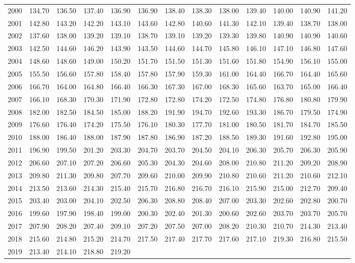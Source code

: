 \begin{longtable}{rrrrrrrrrrrrr}
  2000 & 134.70 & 136.50 & 137.40 & 136.90 & 136.90 & 138.40 & 138.30 & 138.00 & 139.40 & 140.00 & 140.90 & 141.20 \\ 
  2001 & 142.80 & 143.20 & 142.20 & 143.10 & 143.60 & 142.80 & 140.60 & 141.30 & 142.10 & 139.40 & 138.70 & 138.00 \\ 
  2002 & 137.60 & 138.00 & 139.20 & 139.10 & 138.70 & 139.10 & 139.20 & 139.30 & 139.80 & 140.90 & 140.90 & 140.60 \\ 
  2003 & 142.50 & 144.60 & 146.20 & 143.90 & 143.50 & 144.60 & 144.70 & 145.80 & 146.10 & 147.10 & 146.80 & 147.60 \\ 
  2004 & 148.60 & 148.60 & 149.00 & 150.20 & 151.70 & 151.50 & 151.30 & 151.60 & 151.80 & 154.90 & 156.10 & 155.00 \\ 
  2005 & 155.50 & 156.60 & 157.80 & 158.40 & 157.80 & 157.90 & 159.30 & 161.00 & 164.40 & 166.70 & 164.40 & 165.60 \\ 
  2006 & 166.70 & 164.00 & 164.80 & 166.40 & 166.30 & 167.30 & 167.00 & 168.30 & 165.60 & 163.70 & 165.00 & 166.40 \\ 
  2007 & 166.10 & 168.30 & 170.30 & 171.90 & 172.80 & 172.80 & 174.20 & 172.50 & 174.80 & 176.80 & 180.80 & 179.90 \\ 
  2008 & 182.00 & 182.50 & 184.50 & 185.00 & 188.20 & 191.90 & 194.70 & 192.60 & 193.30 & 186.70 & 179.50 & 174.90 \\ 
  2009 & 176.60 & 176.40 & 174.20 & 175.50 & 176.10 & 180.30 & 177.70 & 181.00 & 180.50 & 181.70 & 184.70 & 185.50 \\ 
  2010 & 188.00 & 186.40 & 188.00 & 187.90 & 187.80 & 186.90 & 187.20 & 188.50 & 189.30 & 191.60 & 192.80 & 195.00 \\ 
  2011 & 196.90 & 199.50 & 201.20 & 203.30 & 204.70 & 203.70 & 204.50 & 204.10 & 206.30 & 205.70 & 206.30 & 205.90 \\ 
  2012 & 206.60 & 207.10 & 207.20 & 206.60 & 205.30 & 204.30 & 204.60 & 208.00 & 210.80 & 211.20 & 209.20 & 208.90 \\ 
  2013 & 209.80 & 211.30 & 209.80 & 207.70 & 209.60 & 210.00 & 209.90 & 210.80 & 210.60 & 211.20 & 210.60 & 212.10 \\ 
  2014 & 213.50 & 213.60 & 214.30 & 215.40 & 215.70 & 216.80 & 216.70 & 216.10 & 215.90 & 215.00 & 212.70 & 209.40 \\ 
  2015 & 203.40 & 203.00 & 204.10 & 202.50 & 206.30 & 208.80 & 208.40 & 207.00 & 203.30 & 202.60 & 202.80 & 200.70 \\ 
  2016 & 199.60 & 197.90 & 198.40 & 199.00 & 200.30 & 202.40 & 201.30 & 200.60 & 202.60 & 203.70 & 203.70 & 205.70 \\ 
  2017 & 207.90 & 208.20 & 207.40 & 209.10 & 207.20 & 207.50 & 207.00 & 208.20 & 210.30 & 210.70 & 214.30 & 213.40 \\ 
  2018 & 215.60 & 214.80 & 215.20 & 214.70 & 217.50 & 217.40 & 217.70 & 217.60 & 217.10 & 219.30 & 216.80 & 215.50 \\ 
  2019 & 213.40 & 214.10 & 218.80 & 219.20 &  &  &  &  &  &  &  &  \\ 
   \hline
\hline
\end{longtable}
